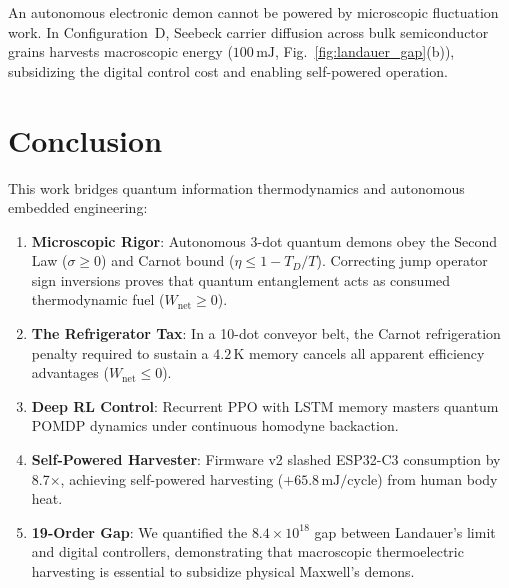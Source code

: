\documentclass[10pt,twocolumn,a4paper]{article}
\begin{document}
An autonomous electronic demon cannot be powered by microscopic fluctuation work. In Configuration~D, Seebeck carrier diffusion across bulk semiconductor grains harvests macroscopic energy ($100\,\mathrm{mJ}$, Fig.~\ref{fig:landauer_gap}(b)), subsidizing the digital control cost and enabling self-powered operation.

\section{Conclusion}
This work bridges quantum information thermodynamics and autonomous embedded engineering:
\begin{enumerate}
    \item \textbf{Microscopic Rigor}: Autonomous 3-dot quantum demons obey the Second Law ($\sigma \ge 0$) and Carnot bound ($\eta \le 1 - T_D/T$). Correcting jump operator sign inversions proves that quantum entanglement acts as consumed thermodynamic fuel ($W_{\mathrm{net}} \ge 0$).
    \item \textbf{The Refrigerator Tax}: In a 10-dot conveyor belt, the Carnot refrigeration penalty required to sustain a $4.2\,\mathrm{K}$ memory cancels all apparent efficiency advantages ($W_{\mathrm{net}} \le 0$).
    \item \textbf{Deep RL Control}: Recurrent PPO with LSTM memory masters quantum POMDP dynamics under continuous homodyne backaction.
    \item \textbf{Self-Powered Harvester}: Firmware v2 slashed ESP32-C3 consumption by 8.7$\times$, achieving self-powered harvesting ($+65.8\,\mathrm{mJ}/\mathrm{cycle}$) from human body heat.
    \item \textbf{19-Order Gap}: We quantified the $8.4 \times 10^{18}$ gap between Landauer's limit and digital controllers, demonstrating that macroscopic thermoelectric harvesting is essential to subsidize physical Maxwell's demons.
\end{enumerate}


\balance

\end{document}
